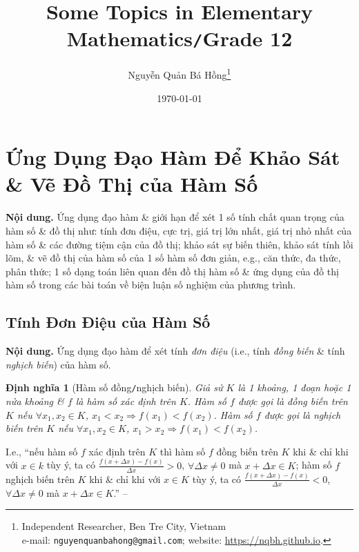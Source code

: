 \documentclass{article}
\title{Some Topics in Elementary Mathematics\texttt{/}Grade 12}
\author{Nguyễn Quản Bá Hồng\footnote{Independent Researcher, Ben Tre City, Vietnam\\e-mail: \texttt{nguyenquanbahong@gmail.com}; website: \url{https://nqbh.github.io}.}}
\date{\today}
\numberwithin{equation}{section}
\newtheorem{dinhnghia}{Định nghĩa}[section]
\begin{document}
\maketitle
\begin{abstract}
	
\end{abstract}
\setcounter{secnumdepth}{4}
\setcounter{tocdepth}{3}
\tableofcontents
\newpage


\section{Ứng Dụng Đạo Hàm Để Khảo Sát \& Vẽ Đồ Thị của Hàm Số}
\textsf{\textbf{Nội dung.} Ứng dụng đạo hàm \& giới hạn để xét 1 số tính chất quan trọng của hàm số \& đồ thị như: tính đơn điệu, cực trị, giá trị lớn nhất, giá trị nhỏ nhất của hàm số \& các đường tiệm cận của đồ thị; khảo sát sự biến thiên, khảo sát tính lồi lõm, \& vẽ đồ thị của hàm số của 1 số hàm số đơn giản, e.g., căn thức, đa thức, phân thức; 1 số dạng toán liên quan đến đồ thị hàm số \& ứng dụng của đồ thị hàm số trong các bài toán về biện luận số nghiệm của phương trình.}

\subsection{Tính Đơn Điệu của Hàm Số}
\textsf{\textbf{Nội dung.} Ứng dụng đạo hàm để xét tính \emph{đơn điệu} (i.e., tính \emph{đồng biến} \& tính \emph{nghịch biến}) của hàm số.}

\begin{dinhnghia}[Hàm số đồng\texttt{/}nghịch biến]
	Giả sử $K$ là 1 khoảng, 1 đoạn hoặc 1 nửa khoảng \& $f$ là hàm số xác định trên $K$. Hàm số $f$ được gọi là \emph{đồng biến} trên $K$ nếu $\forall x_1,x_2\in K$, $x_1 < x_2\Rightarrow f(x_1) < f(x_2)$. Hàm số $f$ được gọi là \emph{nghịch biến} trên $K$ nếu $\forall x_1,x_2\in K$, $x_1 > x_2\Rightarrow f(x_1) < f(x_2)$.
\end{dinhnghia}
I.e., ``nếu hàm số $f$ xác định trên $K$ thì hàm số $f$ đồng biến trên $K$ khi \& chỉ khi với $x\in k$ tùy ý, ta có $\frac{f(x + \Delta x) - f(x)}{\Delta x} > 0$, $\forall\Delta x\ne 0$ mà $x + \Delta x\in K$; hàm số $f$ nghịch biến trên $K$ khi \& chỉ khi với $x\in K$ tùy ý, ta có $\frac{f(x + \Delta x) - f(x)}{\Delta x} < 0$, $\forall\Delta x\ne 0$ mà $x + \Delta x\in K$.'' -- \cite[p. 4]{SGK_Toan_12_giai_tich_nang_cao}
\end{document}
